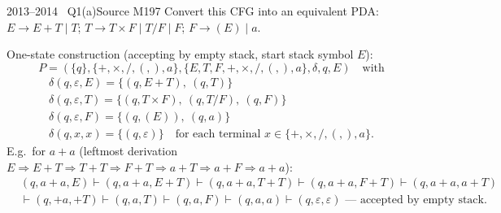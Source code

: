 \documentclass[11pt,a4paper]{article}
\newcommand{\eps}{\varepsilon}
\begin{document}
\begin{question}{2013--2014 \textbullet\ Q1(a)}{Source M19}{7}
Convert this CFG into an equivalent PDA: $E\to E+T\mid T$; $T\to T\times F\mid T/F\mid F$; $F\to(E)\mid a$.
\end{question}
\begin{solution}
One-state construction (accepting by empty stack, start stack symbol $E$):
\[P=(\{q\},\{+,\times,/,(,),a\},\{E,T,F,+,\times,/,(,),a\},\delta,q,E)\quad\text{with}\]
\[\begin{array}{l}
\delta(q,\eps,E)=\{(q,E{+}T),\ (q,T)\}\\
\delta(q,\eps,T)=\{(q,T{\times}F),\ (q,T/F),\ (q,F)\}\\
\delta(q,\eps,F)=\{(q,(E)),\ (q,a)\}\\
\delta(q,x,x)=\{(q,\eps)\}\quad\text{for each terminal } x\in\{+,\times,/,(,),a\}.
\end{array}\]
E.g.\ for $a+a$ (leftmost derivation $E\Rightarrow E+T\Rightarrow T+T\Rightarrow F+T\Rightarrow a+T\Rightarrow a+F\Rightarrow a+a$):
\[\begin{aligned}&(q,a{+}a,E)\vdash(q,a{+}a,E{+}T)\vdash(q,a{+}a,T{+}T)\vdash(q,a{+}a,F{+}T)\vdash(q,a{+}a,a{+}T)\\&\vdash(q,{+}a,{+}T)\vdash(q,a,T)\vdash(q,a,F)\vdash(q,a,a)\vdash(q,\eps,\eps)\text{ --- accepted by empty stack.}\end{aligned}\]
\end{solution}
\end{document}
